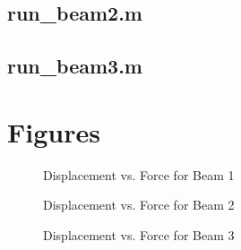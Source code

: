 \documentclass{article}
\begin{document}
\subsection{run\_beam2.m}
%
\pagebreak  %
\subsection{run\_beam3.m}
%
\pagebreak  %
\section{Figures}
\begin{figure}[htb]
\begin{center}
\caption{Displacement vs. Force for Beam 1}
\end{center}
\end{figure}

\begin{figure}[htb]
\begin{center}
\caption{Displacement vs. Force for Beam 2}
\end{center}
\end{figure}

\begin{figure}[htb]
\begin{center}
\caption{Displacement vs. Force for Beam 3}
\end{center}
\end{figure}
\end{document}

